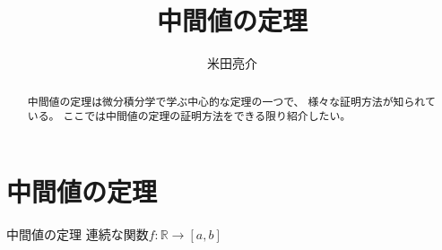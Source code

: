 \documentclass{jsarticle}
\begin{document}
\title{中間値の定理}
\author{米田亮介}
\maketitle	

\begin{abstract}
中間値の定理は微分積分学で学ぶ中心的な定理の一つで、
様々な証明方法が知られている。
ここでは中間値の定理の証明方法をできる限り紹介したい。
\end{abstract}

\section{中間値の定理}
\begin{itembox}[l]{中間値の定理}
連続な関数$f\colon\mathbb{R}\to[a,b]$
\end{itembox}
\end{document}
